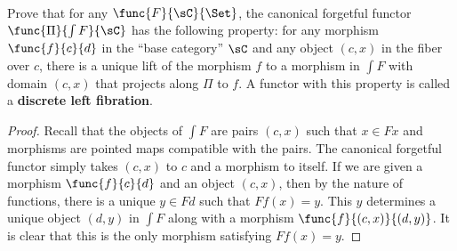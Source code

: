\documentclass[../../main]{subfiles}
\begin{document}
\maketitle

\paragraph{}
\begin{exercise}
	Prove that for any \(\func{F}{\sC}{\Set}\), the canonical forgetful functor
	\(\func{\Pi}{\int F}{\sC}\) has the following property: for any morphism
	\(\func{f}{c}{d}\) in the ``base category'' \(\sC\) and any object \((c,x)\)
	in the fiber over \(c\), there is a unique lift of the morphism \(f\) to a
	morphism in \(\int F\) with domain \((c,x)\) that projects along \(\Pi\) to
	\(f\). A functor with this property is called a \textbf{discrete left
	fibration}.
\end{exercise}

\begin{proof}
	Recall that the objects of \(\int F\) are pairs \((c,x)\) such that
	\(x\in Fx\) and morphisms are pointed maps compatible with the pairs. The
	canonical forgetful functor simply takes \((c,x)\) to \(c\) and a morphism
	to itself. If we are given a morphism \(\func{f}{c}{d}\) and an object
	\((c,x)\), then by the nature of functions, there is a unique \(y\in Fd\)
	such that \(Ff(x)=y\). This \(y\) determines a unique object \((d,y)\) in
	\(\int F\) along with a morphism \(\func{f}{(c,x)}{(d,y)}\). It is clear
	that this is the only morphism satisfying \(Ff(x)=y\).
\end{proof}
\end{document}

